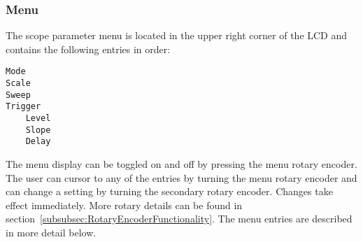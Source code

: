 \documentclass[12pt]{refart} %
\begin{document}
\subsubsection{Menu}
The scope parameter menu is located in the upper right corner of the LCD and contains the following entries in order:

\begin{verbatim}
Mode
Scale
Sweep
Trigger
    Level
    Slope
    Delay
\end{verbatim}

The menu display can be toggled on and off by pressing the menu rotary encoder. The user can cursor to any of the entries by turning the menu rotary encoder and can change a setting by turning the secondary rotary encoder. Changes take effect immediately. More rotary details can be found in section~\ref{subsubsec:RotaryEncoderFunctionality}. The menu entries are described in more detail below.
\end{document}
